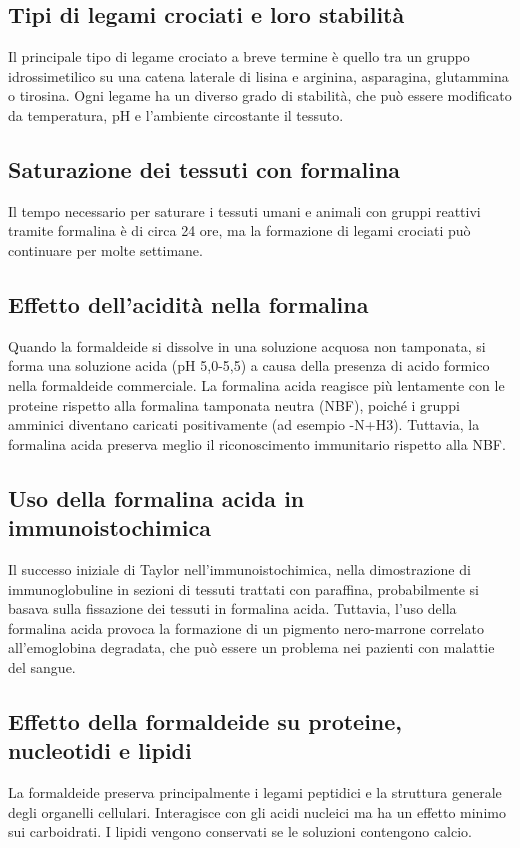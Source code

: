 \subsection{Tipi di legami crociati e loro stabilità}
Il principale tipo di legame crociato a breve termine è quello tra un gruppo idrossimetilico su una catena laterale di lisina e arginina, asparagina, glutammina o tirosina. Ogni legame ha un diverso grado di stabilità, che può essere modificato da temperatura, pH e l'ambiente circostante il tessuto.

\subsection{Saturazione dei tessuti con formalina}
Il tempo necessario per saturare i tessuti umani e animali con gruppi reattivi tramite formalina è di circa 24 ore, ma la formazione di legami crociati può continuare per molte settimane.

\subsection{Effetto dell'acidità nella formalina}
Quando la formaldeide si dissolve in una soluzione acquosa non tamponata, si forma una soluzione acida (pH 5,0-5,5) a causa della presenza di acido formico nella formaldeide commerciale. La formalina acida reagisce più lentamente con le proteine rispetto alla formalina tamponata neutra (NBF), poiché i gruppi amminici diventano caricati positivamente (ad esempio -N+H3). Tuttavia, la formalina acida preserva meglio il riconoscimento immunitario rispetto alla NBF.

\subsection{Uso della formalina acida in immunoistochimica}
Il successo iniziale di Taylor nell'immunoistochimica, nella dimostrazione di immunoglobuline in sezioni di tessuti trattati con paraffina, probabilmente si basava sulla fissazione dei tessuti in formalina acida. Tuttavia, l'uso della formalina acida provoca la formazione di un pigmento nero-marrone correlato all'emoglobina degradata, che può essere un problema nei pazienti con malattie del sangue.

\subsection{Effetto della formaldeide su proteine, nucleotidi e lipidi}
La formaldeide preserva principalmente i legami peptidici e la struttura generale degli organelli cellulari. Interagisce con gli acidi nucleici ma ha un effetto minimo sui carboidrati. I lipidi vengono conservati se le soluzioni contengono calcio.


